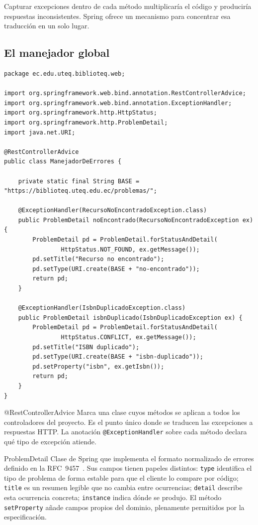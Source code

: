 \documentclass[11pt,a4paper,openany]{book}
\begin{document}
Capturar excepciones dentro de cada método multiplicaría el código y produciría respuestas inconsistentes. Spring ofrece un mecanismo para concentrar esa traducción en un solo lugar.

\subsection{El manejador global}
\label{sec:manejador-global}

\begin{lstlisting}[style=java,caption={Manejador global que traduce excepciones a detalles de problema.},label={lst:advice}]
package ec.edu.uteq.biblioteq.web;

import org.springframework.web.bind.annotation.RestControllerAdvice;
import org.springframework.web.bind.annotation.ExceptionHandler;
import org.springframework.http.HttpStatus;
import org.springframework.http.ProblemDetail;
import java.net.URI;

@RestControllerAdvice
public class ManejadorDeErrores {

	private static final String BASE = "https://biblioteq.uteq.edu.ec/problemas/";

	@ExceptionHandler(RecursoNoEncontradoException.class)
	public ProblemDetail noEncontrado(RecursoNoEncontradoException ex) {
		ProblemDetail pd = ProblemDetail.forStatusAndDetail(
				HttpStatus.NOT_FOUND, ex.getMessage());
		pd.setTitle("Recurso no encontrado");
		pd.setType(URI.create(BASE + "no-encontrado"));
		return pd;
	}

	@ExceptionHandler(IsbnDuplicadoException.class)
	public ProblemDetail isbnDuplicado(IsbnDuplicadoException ex) {
		ProblemDetail pd = ProblemDetail.forStatusAndDetail(
				HttpStatus.CONFLICT, ex.getMessage());
		pd.setTitle("ISBN duplicado");
		pd.setType(URI.create(BASE + "isbn-duplicado"));
		pd.setProperty("isbn", ex.getIsbn());
		return pd;
	}
}
\end{lstlisting}

\begin{cajadefinicion}{@RestControllerAdvice}
	Marca una clase cuyos métodos se aplican a todos los controladores del proyecto. Es el punto único donde se traducen las excepciones a respuestas HTTP. La anotación \texttt{@ExceptionHandler} sobre cada método declara qué tipo de excepción atiende.
\end{cajadefinicion}

\begin{cajadefinicion}{ProblemDetail}
	Clase de Spring que implementa el formato normalizado de errores definido en la RFC~9457~\cite{rfc9457}. Sus campos tienen papeles distintos: \texttt{type} identifica el tipo de problema de forma estable para que el cliente lo compare por código; \texttt{title} es un resumen legible que no cambia entre ocurrencias; \texttt{detail} describe esta ocurrencia concreta; \texttt{instance} indica dónde se produjo. El método \texttt{setProperty} añade campos propios del dominio, plenamente permitidos por la especificación.
\end{cajadefinicion}
\end{document}
